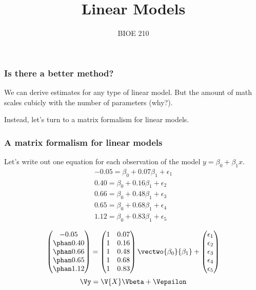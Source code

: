 \documentclass{beamer}
\title{Linear Models}
\date{}
\author{BIOE 210}
\begin{document}
\maketitle

\begin{frame}
\frametitle{Is there a better method?}

We can derive estimates for any type of linear model. But the amount of math scales cubicly with the number of parameters (why?).

\bigskip
Instead, let's turn to a matrix formalism for linear models.	
\end{frame}

\begin{frame}
\frametitle{A matrix formalism for linear models}
Let's write out one equation for each observation of the model $y = \beta_0 + \beta_1x$.
\begin{align*}
	-0.05 = \beta_0 + 0.07\beta_1 + \epsilon_1 \\
	0.40 = \beta_0 + 0.16\beta_1 + \epsilon_2 \\
	0.66 = \beta_0 + 0.48\beta_1 + \epsilon_3 \\
	0.65 = \beta_0 + 0.68\beta_1 + \epsilon_4 \\
	1.12 = \beta_0 + 0.83\beta_1 + \epsilon_5
\end{align*}

\pause
\[ \begin{pmatrix} -0.05\\ \phan0.40\\ \phan0.66\\ \phan0.65\\ \phan1.12 \end{pmatrix} = \begin{pmatrix} 1&0.07\\ 1&0.16\\ 1&0.48\\ 1&0.68\\ 1&0.83 \end{pmatrix} \vectwo{\beta_0}{\beta_1} + \begin{pmatrix} \epsilon_1\\ \epsilon_2\\ \epsilon_3\\ \epsilon_4\\ \epsilon_5 \end{pmatrix} \]
\pause
\[ \Vy = \V{X}\Vbeta+\Vepsilon \]	
\end{frame}
\end{document}
